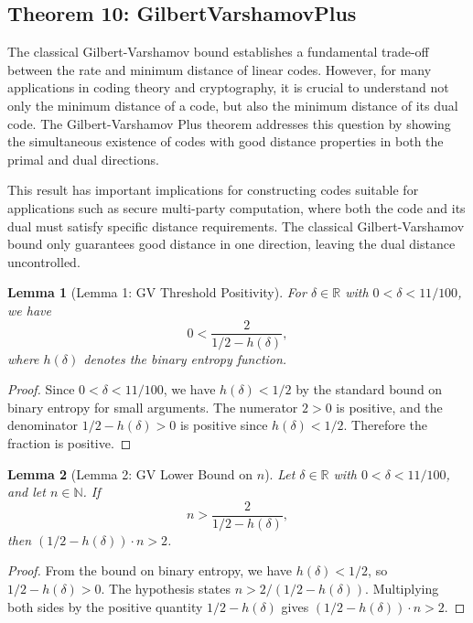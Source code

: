 \documentclass[11pt]{article}
\theoremstyle{plain}
\newtheorem*{lemma}{Lemma}
\theoremstyle{definition}
\theoremstyle{remark}
\begin{document}
\vspace{1em}

\subsection{Theorem 10: GilbertVarshamovPlus}

The classical Gilbert-Varshamov bound establishes a fundamental trade-off between the rate and minimum distance of linear codes. However, for many applications in coding theory and cryptography, it is crucial to understand not only the minimum distance of a code, but also the minimum distance of its dual code. The Gilbert-Varshamov Plus theorem addresses this question by showing the simultaneous existence of codes with good distance properties in both the primal and dual directions.

This result has important implications for constructing codes suitable for applications such as secure multi-party computation, where both the code and its dual must satisfy specific distance requirements. The classical Gilbert-Varshamov bound only guarantees good distance in one direction, leaving the dual distance uncontrolled.

\begin{lemma}[Lemma 1: GV Threshold Positivity]
For $\delta \in \mathbb{R}$ with $0 < \delta < 11/100$, we have
\[
0 < \frac{2}{1/2 - h(\delta)},
\]
where $h(\delta)$ denotes the binary entropy function.
\end{lemma}

\begin{proof}
Since $0 < \delta < 11/100$, we have $h(\delta) < 1/2$ by the standard bound on binary entropy for small arguments. The numerator $2 > 0$ is positive, and the denominator $1/2 - h(\delta) > 0$ is positive since $h(\delta) < 1/2$. Therefore the fraction is positive.
\end{proof}

\begin{lemma}[Lemma 2: GV Lower Bound on $n$]
Let $\delta \in \mathbb{R}$ with $0 < \delta < 11/100$, and let $n \in \mathbb{N}$. If
\[
n > \frac{2}{1/2 - h(\delta)},
\]
then $(1/2 - h(\delta)) \cdot n > 2$.
\end{lemma}

\begin{proof}
From the bound on binary entropy, we have $h(\delta) < 1/2$, so $1/2 - h(\delta) > 0$. The hypothesis states $n > 2/(1/2 - h(\delta))$. Multiplying both sides by the positive quantity $1/2 - h(\delta)$ gives $(1/2 - h(\delta)) \cdot n > 2$.
\end{proof}
\end{document}
